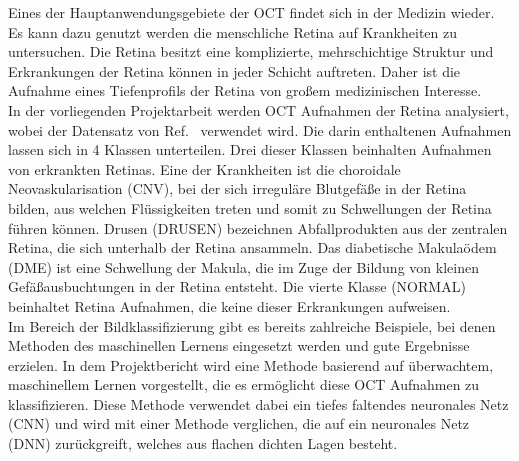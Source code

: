 Eines der Hauptanwendungsgebiete der OCT findet sich in der Medizin wieder. Es kann dazu genutzt werden die menschliche Retina auf Krankheiten zu untersuchen. Die Retina besitzt eine komplizierte, mehrschichtige Struktur und Erkrankungen der Retina können in jeder Schicht auftreten. Daher ist die Aufnahme eines Tiefenprofils der Retina von gro{\ss}em medizinischen Interesse. \\
In der vorliegenden Projektarbeit werden OCT Aufnahmen der Retina analysiert, wobei der Datensatz von Ref.~\cite{Dataset} verwendet wird. Die darin enthaltenen Aufnahmen lassen sich in 4 Klassen unterteilen. Drei dieser Klassen beinhalten Aufnahmen von erkrankten Retinas. Eine der Krankheiten ist die choroidale Neovaskularisation (CNV), bei der sich irreguläre Blutgefä{\ss}e in der Retina bilden, aus welchen Flüssigkeiten treten und somit zu Schwellungen der Retina führen können. Drusen (DRUSEN) bezeichnen Abfallprodukten aus der zentralen Retina, die sich unterhalb der Retina ansammeln. Das diabetische Makulaödem (DME) ist eine Schwellung der Makula, die im Zuge der Bildung von kleinen Gefä{\ss}ausbuchtungen in der Retina entsteht. Die vierte Klasse (NORMAL) beinhaltet Retina Aufnahmen, die keine dieser Erkrankungen aufweisen. \\
Im Bereich der Bildklassifizierung gibt es bereits zahlreiche Beispiele, bei denen Methoden des maschinellen Lernens eingesetzt werden und gute Ergebnisse erzielen. In dem Projektbericht wird eine Methode basierend auf überwachtem, maschinellem Lernen vorgestellt, die es ermöglicht diese OCT Aufnahmen zu klassifizieren. Diese Methode verwendet dabei ein tiefes faltendes neuronales Netz (CNN) und wird mit einer Methode verglichen, die auf ein neuronales Netz (DNN) zurückgreift, welches aus flachen dichten Lagen besteht. 